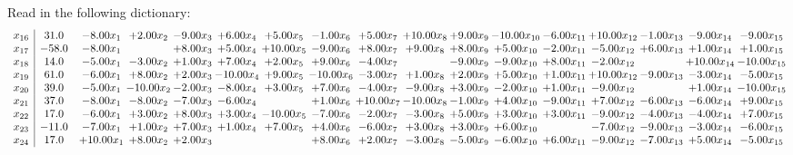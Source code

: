 \documentclass[9pt]{article}
\begin{document}
Read in the following dictionary:
\[\begin{array}{c| c c@{\hskip 2pt} c@{\hskip 2pt} c@{\hskip 2pt} c@{\hskip 2pt} c@{\hskip 2pt} c@{\hskip 2pt} c@{\hskip 2pt} c@{\hskip 2pt} c@{\hskip 2pt} c@{\hskip 2pt} c@{\hskip 2pt} c@{\hskip 2pt} c@{\hskip 2pt} c@{\hskip 2pt} c@{\hskip 2pt} }
 x_{16}   &  31.0 & -8.00 x_{1} & +  2.00 x_{2} & -9.00 x_{3} & +  6.00 x_{4} & +  5.00 x_{5} & -1.00 x_{6} & +  5.00 x_{7} & + 10.00 x_{8} & +  9.00 x_{9} & -10.00 x_{10} & -6.00 x_{11} & + 10.00 x_{12} & -1.00 x_{13} & -9.00 x_{14} & -9.00 x_{15}\\
 x_{17}   &  -58.0 & -8.00 x_{1} &   & +  8.00 x_{3} & +  5.00 x_{4} & + 10.00 x_{5} & -9.00 x_{6} & +  8.00 x_{7} & +  9.00 x_{8} & +  8.00 x_{9} & +  5.00 x_{10} & -2.00 x_{11} & -5.00 x_{12} & +  6.00 x_{13} & +  1.00 x_{14} & +  1.00 x_{15}\\
 x_{18}   &  14.0 & -5.00 x_{1} & -3.00 x_{2} & +  1.00 x_{3} & +  7.00 x_{4} & +  2.00 x_{5} & +  9.00 x_{6} & -4.00 x_{7} &   & -9.00 x_{9} & -9.00 x_{10} & +  8.00 x_{11} & -2.00 x_{12} &   & + 10.00 x_{14} & -10.00 x_{15}\\
 x_{19}   &  61.0 & -6.00 x_{1} & +  8.00 x_{2} & +  2.00 x_{3} & -10.00 x_{4} & +  9.00 x_{5} & -10.00 x_{6} & -3.00 x_{7} & +  1.00 x_{8} & +  2.00 x_{9} & +  5.00 x_{10} & +  1.00 x_{11} & + 10.00 x_{12} & -9.00 x_{13} & -3.00 x_{14} & -5.00 x_{15}\\
 x_{20}   &  39.0 & -5.00 x_{1} & -10.00 x_{2} & -2.00 x_{3} & -8.00 x_{4} & +  3.00 x_{5} & +  7.00 x_{6} & -4.00 x_{7} & -9.00 x_{8} & +  3.00 x_{9} & -2.00 x_{10} & +  1.00 x_{11} & -9.00 x_{12} &   & +  1.00 x_{14} & -10.00 x_{15}\\
 x_{21}   &  37.0 & -8.00 x_{1} & -8.00 x_{2} & -7.00 x_{3} & -6.00 x_{4} &   & +  1.00 x_{6} & + 10.00 x_{7} & -10.00 x_{8} & -1.00 x_{9} & +  4.00 x_{10} & -9.00 x_{11} & +  7.00 x_{12} & -6.00 x_{13} & -6.00 x_{14} & +  9.00 x_{15}\\
 x_{22}   &  17.0 & -6.00 x_{1} & +  3.00 x_{2} & +  8.00 x_{3} & +  3.00 x_{4} & -10.00 x_{5} & -7.00 x_{6} & -2.00 x_{7} & -3.00 x_{8} & +  5.00 x_{9} & +  3.00 x_{10} & +  3.00 x_{11} & -9.00 x_{12} & -4.00 x_{13} & -4.00 x_{14} & +  7.00 x_{15}\\
 x_{23}   &  -11.0 & -7.00 x_{1} & +  1.00 x_{2} & +  7.00 x_{3} & +  1.00 x_{4} & +  7.00 x_{5} & +  4.00 x_{6} & -6.00 x_{7} & +  3.00 x_{8} & +  3.00 x_{9} & +  6.00 x_{10} &   & -7.00 x_{12} & -9.00 x_{13} & -3.00 x_{14} & -6.00 x_{15}\\
 x_{24}   &  17.0 & + 10.00 x_{1} & +  8.00 x_{2} & +  2.00 x_{3} &    &   & +  8.00 x_{6} & +  2.00 x_{7} & -3.00 x_{8} & -5.00 x_{9} & -6.00 x_{10} & +  6.00 x_{11} & -9.00 x_{12} & -7.00 x_{13} & +  5.00 x_{14} & -5.00 x_{15}\\

\end{array}\]
\end{document}
